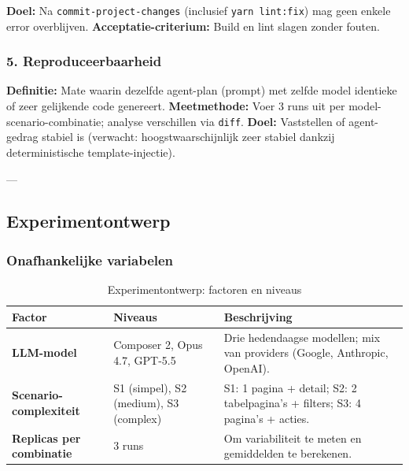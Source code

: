 \noindent
\textbf{Doel:} Na \texttt{commit-project-changes} (inclusief \texttt{yarn lint:fix}) mag geen enkele error overblijven. \newline
\textbf{Acceptatie-criterium:} Build en lint slagen zonder fouten.

\subsubsection{5. Reproduceerbaarheid}

\noindent
\textbf{Definitie:} Mate waarin dezelfde agent-plan (prompt) met zelfde model identieke of zeer gelijkende code genereert. \newline
\textbf{Meetmethode:} Voer 3 runs uit per model-scenario-combinatie; analyse verschillen via \texttt{diff}. \newline
\textbf{Doel:} Vaststellen of agent-gedrag stabiel is (verwacht: hoogstwaarschijnlijk zeer stabiel dankzij deterministische template-injectie).

---

\subsection{Experimentontwerp}

\subsubsection{Onafhankelijke variabelen}

\begin{table}[htbp]
  \centering
  \caption{Experimentontwerp: factoren en niveaus}
  \label{tab:experiment-design}
  \small
  \begin{tabularx}{\textwidth}{|l|l|l|}
    \hline
    \textbf{Factor} & \textbf{Niveaus} & \textbf{Beschrijving} \\
    \hline
    \textbf{LLM-model} &
    Composer 2, Opus 4.7, GPT-5.5 &
    Drie hedendaagse modellen; mix van providers (Google, Anthropic, OpenAI). \\
    \hline
    \textbf{Scenario-complexiteit} &
    S1 (simpel), S2 (medium), S3 (complex) &
    S1: 1 pagina + detail; S2: 2 tabelpagina's + filters; S3: 4 pagina's + acties. \\
    \hline
    \textbf{Replicas per combinatie} &
    3 runs &
    Om variabiliteit te meten en gemiddelden te berekenen. \\
    \hline
  \end{tabularx}
\end{table}

